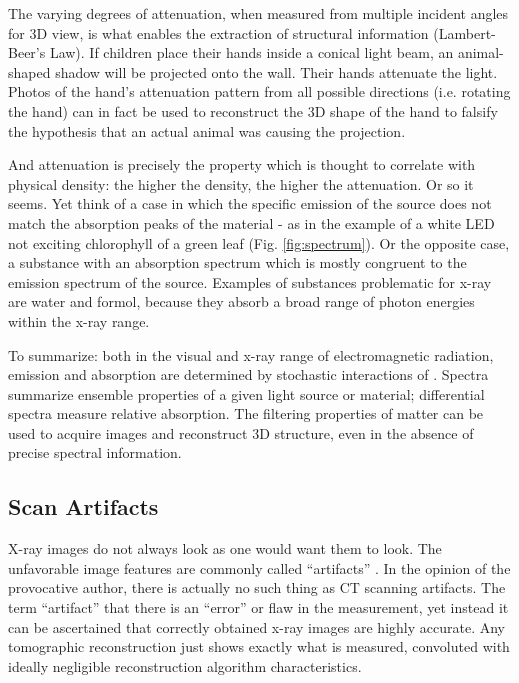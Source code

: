 The varying degrees of attenuation, when measured from multiple incident angles for 3D view, is what enables the extraction of structural information (Lambert-Beer's Law).
If children place their hands inside a conical light beam, an animal-shaped shadow will be projected onto the wall.
Their hands attenuate the light.
Photos of the hand's attenuation pattern from all possible directions (i.e. rotating the hand) can in fact be used to reconstruct the 3D shape of the hand to falsify the hypothesis that an actual animal was causing the projection.

And attenuation is precisely the property which is thought to correlate with physical density: the higher the density, the higher the attenuation.
Or so it seems.
Yet think of a case in which the specific emission of the source does not match the absorption peaks of the material - as in the example of a white LED not exciting chlorophyll of a green leaf (Fig. \ref{fig:spectrum}).
Or the opposite case, a substance with an absorption spectrum which is mostly congruent to the emission spectrum of the source.
Examples of substances problematic for x-ray are water and formol, because they absorb a broad range of photon energies within the x-ray range.


To summarize: both in the visual and x-ray range of electromagnetic radiation, emission and absorption are determined by stochastic interactions of .
Spectra summarize ensemble properties of a given light source or material; differential spectra measure relative absorption.
The filtering properties of matter can be used to acquire images and reconstruct 3D structure, even in the absence of precise spectral information.
\subsection{Scan Artifacts}
\label{sec:orgbd5e812}
X-ray images do not always look as one would want them to look.
The unfavorable image features are commonly called ``artifacts'' \citep{Triche2019}.
In the opinion of the provocative author, there is actually no such thing as CT scanning artifacts.
The term ``artifact''  that there is an ``error'' or flaw in the measurement, yet instead it can be ascertained that correctly obtained x-ray images are highly accurate.
Any tomographic reconstruction just shows exactly what is measured, convoluted with ideally negligible reconstruction algorithm characteristics.


